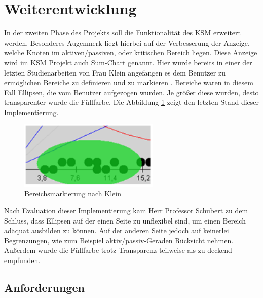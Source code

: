 \section{Weiterentwicklung}

In der zweiten Phase des Projekts soll die Funktionalität des KSM erweitert werden. Besonderes Augenmerk liegt hierbei auf der Verbesserung der Anzeige, welche Knoten im aktiven/passiven, oder kritischen Bereich liegen. Diese Anzeige wird im KSM Projekt auch Sum-Chart genannt. Hier wurde bereits in einer der letzten Studienarbeiten von Frau Klein angefangen es dem Benutzer zu ermöglichen Bereiche zu definieren und zu markieren \cite{bib:klein}. Bereiche waren in diesem Fall Ellipsen, die vom Benutzer aufgezogen wurden. Je größer diese wurden, desto transparenter wurde die Füllfarbe. Die Abbildung \ref{ellipse} zeigt den letzten Stand dieser Implementierung.
\begin{figure}[h]
	\centering
	\includegraphics[width=0.6\textwidth]{pictures/ellipse.png}
	\caption{Bereichsmarkierung nach Klein \cite{bib:klein}}
	\label{ellipse}
\end{figure}

Nach Evaluation dieser Implementierung kam Herr Professor Schubert zu dem Schluss, dass Ellipsen auf der einen Seite zu unflexibel sind, um einen Bereich adäquat ausbilden zu können. Auf der anderen Seite jedoch auf keinerlei Begrenzungen, wie zum Beispiel aktiv/passiv-Geraden  Rücksicht nehmen. Außerdem wurde die Füllfarbe trotz Transparenz teilweise als zu deckend empfunden.

\subsection{Anforderungen}

